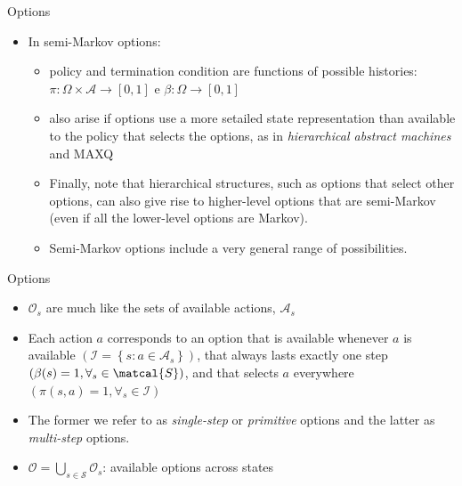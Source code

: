 \begin{frame}{Options}
    \begin{itemize}
        \item In semi-Markov options:
        \begin{itemize}
            \item policy and termination condition are functions of possible histories: $\pi:\Omega \times \mathcal{A} \rightarrow [0,1]$ e $\beta:\Omega \rightarrow [0,1]$
            \item also arise if options use a more setailed state representation than available to the policy that selects the options, as in \textit{hierarchical abstract machines} and MAXQ
            \item Finally, note that hierarchical structures, such as options that select other options, can also give rise to higher-level options that are semi-Markov (even if all the lower-level options are Markov). \item Semi-Markov options include a very general range of possibilities.
        \end{itemize}
    \end{itemize}
\end{frame}

\begin{frame}{Options}
    \begin{itemize}
        \item $\mathcal{O}_s$ are much like the sets of available actions, $\mathcal{A}_s$
        \item Each action $a$ corresponds to an option that is available whenever $a$ is available $(\mathcal{I} = \left \{s: a \in \mathcal{A}_s \right \} )$, that always lasts exactly one step $(\beta(s) = 1, \forall_s \in \matcal{S})$, and that selects $a$ everywhere $(\pi(s,a) = 1, \forall_s \in \mathcal{I})$
        \item The former we refer to as \textit{single-step} or \textit{primitive} options and the latter as \textit{multi-step} options.
        \item $\mathcal{O} = \bigcup_{s \in \mathcal{S}} \mathcal{O}_s$: available options across states
    \end{itemize}
\end{frame}

